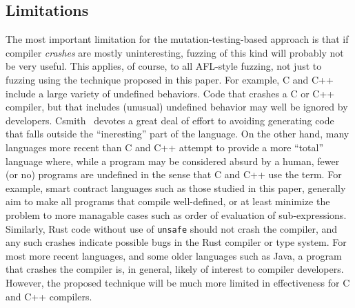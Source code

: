\subsection{Limitations}

The most important limitation for the mutation-testing-based approach is that if compiler \emph{crashes} are mostly uninteresting, fuzzing of this kind will probably not be very useful.  This applies, of course, to all AFL-style fuzzing, not just to fuzzing using the technique proposed in this paper.  For example, C and C++ include a large variety of undefined behaviors.  Code that crashes a C or C++ compiler, but that includes (unusual) undefined behavior may well be ignored by developers.  Csmith~\cite{csmith} devotes a great deal of effort to avoiding generating code that falls outside the ``ineresting'' part of the language.  On the other hand, many languages more recent than C and C++ attempt to provide a more ``total'' language where, while a program may be considered absurd by a human, fewer (or no) programs are undefined in the sense that C and C++ use the term.  For example, smart contract languages such as those studied in this paper, generally aim to make all programs that compile well-defined, or at least minimize the problem to more managable cases such as order of evaluation of sub-expressions.  Similarly, Rust code without use of {\tt unsafe} should not crash the compiler, and any such crashes indicate possible bugs in the Rust compiler or type system.  For most more recent languages, and some older languages such as Java, a program that crashes the compiler is, in general, likely of interest to compiler developers.  However, the proposed technique will be much more limited in effectiveness for C and C++ compilers.